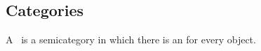 \subsection{Categories}

\begin{ctdefinition}[Category]
    \label{def:categorymain}
    A ~\CatC is a semicategory in which there is an  for every object.
\end{ctdefinition}

